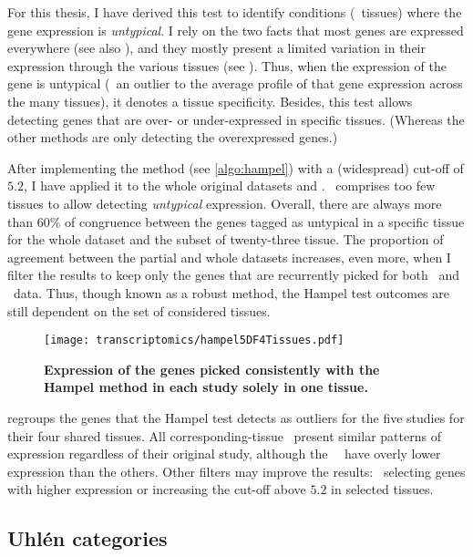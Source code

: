For this thesis, I have derived this test to identify conditions (\ie\ tissues)
where the gene expression is \emph{untypical}.
I rely on the two facts that
most genes are expressed everywhere 
(see also ),
and they mostly present a limited variation in their expression
through the various tissues (see ).
Thus, when the expression of the gene is untypical
(\ie\ an outlier to the average profile of that gene expression across the many tissues),
it denotes a tissue specificity.
Besides,
this test allows detecting genes that are over- or under-expressed in specific tissues.
(Whereas the other methods are only detecting the overexpressed genes.)

After implementing the method (see \cref{algo:hampel})
with a (widespread) cut-off of $5.2$, %
I have applied it to the whole original datasets and \setTwo.
\setOne\ comprises too few tissues to allow detecting \emph{untypical} expression.
Overall, there are always more than 60\% of congruence between the genes tagged
as untypical in a specific tissue for the whole dataset
and the subset of twenty-three tissue.
The proportion of agreement between the partial and whole datasets increases,
even more, when I filter the results to keep only the genes that are recurrently
picked for both \uhlen\ and \gtex\ data.
Thus, though known as a robust method,
the Hampel test outcomes are still dependent on the set of considered tissues.

\begin{figure}[!ht]
    \texttt{[image: transcriptomics/hampel5DF4Tissues.pdf]}\centering
    \caption[Expression of the genes picked with Hampel method]{\label{fig:hampelExp}%
    \textbf{Expression of the genes picked consistently with the Hampel method
    in each study solely in one tissue.}}
\end{figure}

 regroups the genes that the Hampel test detects
as outliers for the five studies for their four shared tissues.
All corresponding-tissue \treps\ present similar patterns of expression
regardless of their original study,
although the \castle\ \treps\ have overly lower expression than the others.
Other filters may improve the results:
\eg\ selecting genes with higher expression or
increasing the cut-off above $5.2$ in selected tissues.

\subsection{Uhlén categories}\label{sub:UhlenGeneCat}

